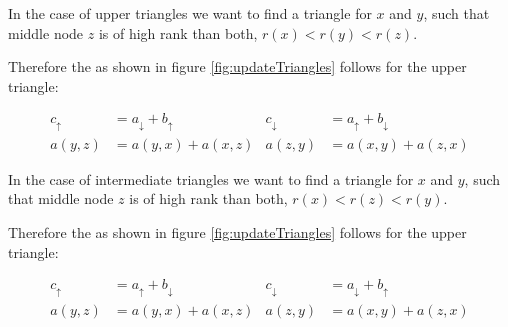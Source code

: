 In the case of upper triangles we want to find a triangle for $x$ and $y$, such that middle node $z$ is of high rank than both,  $r(x) < r(y) < r(z)$.

Therefore the as shown in figure \ref{fig:updateTriangles} follows for the upper triangle:

\begin{align*}\label{eq:upper_triangle}
    c_\uparrow & = a_\downarrow + b_\uparrow    &  c_\downarrow & = a_\uparrow + b_\downarrow \\
    a(y, z) & = a(y, x) + a(x, z) & a(z, y) & = a(x, y) + a(z, x)
\end{align*}

In the case of intermediate triangles we want to find a triangle for $x$ and $y$, such that middle node $z$ is of high rank than both,  $r(x) < r(z) < r(y)$.

Therefore the as shown in figure \ref{fig:updateTriangles} follows for the upper triangle:

\begin{align*}
    c_\uparrow & = a_\uparrow + b_\downarrow    &  c_\downarrow & = a_\downarrow + b_\uparrow \\
    a(y, z) & = a(y, x) + a(x, z) & a(z, y) & = a(x, y) + a(z, x)
\end{align*}
